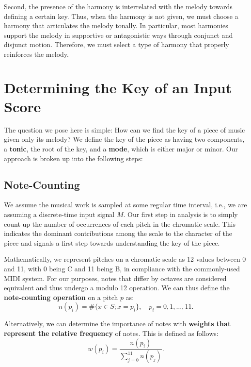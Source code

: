 \documentclass[11pt]{article}
\begin{document}
Second, the presence of the harmony is interrelated with the melody towards defining a certain key. Thus, when the harmony is not given, we must choose a harmony that articulates the melody tonally. In particular, most harmonies support the melody in supportive or antagonistic ways through conjunct and disjunct motion. Therefore, we must select a type of harmony that properly reinforces the melody.

\section{Determining the Key of an Input Score} 
The question we pose here is simple: How can we find the key of a piece of music given only its melody? We define the key of the piece as having two components, a {\bf tonic}, the root of the key, and a {\bf mode}, which is either major or minor. Our approach is broken up into the following steps:

\subsection{Note-Counting}
We assume the musical work is sampled at some regular time interval, i.e., we are assuming a discrete-time input signal $M$. Our first step in analysis is to simply count up the number of occurrences of each pitch in the chromatic scale. This indicates the dominant contributions among the scale to the character of the piece and signals a first step towards understanding the key of the piece.

Mathematically, we represent pitches on a chromatic scale as 12 values between 0 and 11, with 0 being C and 11 being B, in compliance with the commonly-used MIDI system. For our purposes, notes that differ by octaves are considered equivalent and thus undergo a modulo 12 operation. We can thus define the {\bf note-counting operation} on a pitch $p$ as:
\[n(p_i) = \#\{x\in S; x = p_i\}, \quad p_i=0,1,\ldots,11. \]

Alternatively, we can determine the importance of notes with {\bf weights that represent the relative frequency} of notes. This is defined as follows:
\[w(p_i) = \frac{n(p_i)}{\sum_{j=0}^{11} n(p_j)}.\]

\end{document}
